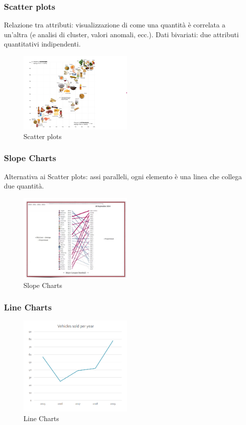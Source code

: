 \subsubsection{Scatter plots}
Relazione tra attributi: visualizzazione di come una quantità è correlata a un'altra 
(e analisi di cluster, valori anomali, ecc.). Dati bivariati: 
due attributi quantitativi indipendenti.
\begin{figure}[H]
    \centering
    \includegraphics[width=0.5\textwidth]{images/ScatterPlots.png} %
    \caption{Scatter plots}
    \label{fig:immagine}
\end{figure}
\subsubsection{Slope Charts}
Alternativa ai Scatter plots: assi paralleli, ogni elemento è una linea che collega due quantità.
\begin{figure}[H]
    \centering
    \includegraphics[width=0.5\textwidth]{images/SlopeCharts.png} 
    \caption{Slope Charts}
    \label{fig:immagine}
\end{figure}
\subsubsection{Line Charts}
\begin{figure}[H]
    \centering
    \includegraphics[width=0.5\textwidth]{images/LineCharts.png}
    \caption{Line Charts}
    \label{fig:immagine}
\end{figure}
